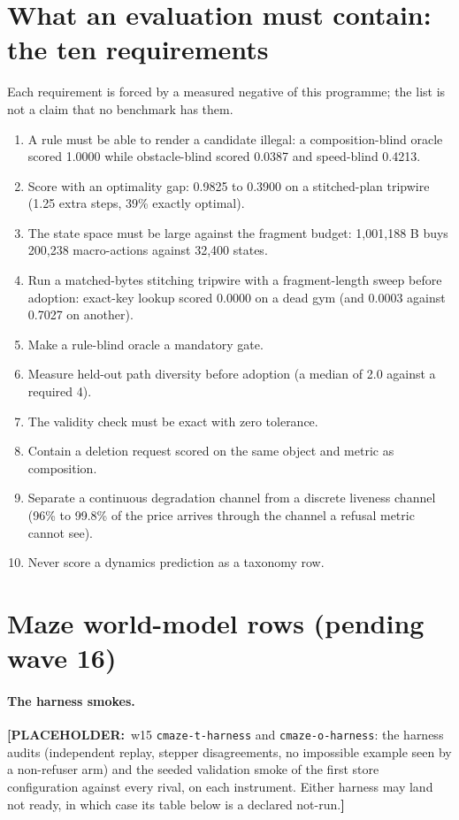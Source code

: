 \documentclass{article}
\newcommand{\PLACEHOLDER}[1]{{\color{red}\textbf{[PLACEHOLDER:}~#1\textbf{]}}}
\begin{document}
\section{What an evaluation must contain: the ten requirements}
\label{app:bench}

Each requirement is forced by a measured negative of this programme; the list is not a claim that
no benchmark has them.
\begin{enumerate}[leftmargin=*,itemsep=1pt]
\item A rule must be able to render a candidate illegal: a composition-blind oracle scored 1.0000
  while obstacle-blind scored 0.0387 and speed-blind 0.4213.
\item Score with an optimality gap: 0.9825 to 0.3900 on a stitched-plan tripwire (1.25 extra steps,
  39\% exactly optimal).
\item The state space must be large against the fragment budget: 1,001,188 B buys 200,238
  macro-actions against 32,400 states.
\item Run a matched-bytes stitching tripwire with a fragment-length sweep before adoption: exact-key
  lookup scored 0.0000 on a dead gym (and 0.0003 against 0.7027 on another).
\item Make a rule-blind oracle a mandatory gate.
\item Measure held-out path diversity before adoption (a median of 2.0 against a required 4).
\item The validity check must be exact with zero tolerance.
\item Contain a deletion request scored on the same object and metric as composition.
\item Separate a continuous degradation channel from a discrete liveness channel (96\% to 99.8\% of
  the price arrives through the channel a refusal metric cannot see).
\item Never score a dynamics prediction as a taxonomy row.
\end{enumerate}

\section{Maze world-model rows (pending wave 16)}
\label{app:mazewm}

\paragraph{The harness smokes.} \PLACEHOLDER{w15 \texttt{cmaze-t-harness} and
\texttt{cmaze-o-harness}: the harness audits (independent replay, stepper disagreements, no
impossible example seen by a non-refuser arm) and the seeded validation smoke of the first
store configuration against every rival, on each instrument. Either harness may land not
ready, in which case its table below is a declared not-run.}
\end{document}
